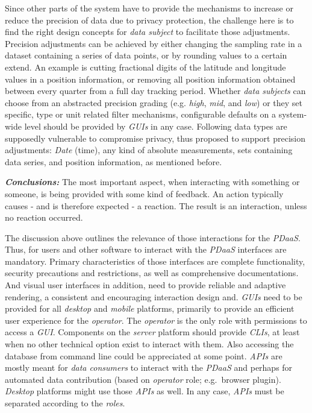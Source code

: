 \documentclass[12pt,english,a4paper,titlepage,cleardoublepage=empty,dottedtoc]{report}
\begin{document}
Since other parts of the system have to provide the mechanisms to
increase or reduce the precision of data due to privacy protection, the
challenge here is to find the right design concepts for \emph{data
subject} to facilitate those adjustments. Precision adjustments can be
achieved by either changing the sampling rate in a dataset containing a
series of data points, or by rounding values to a certain extend. An
example is cutting fractional digits of the latitude and longitude
values in a position information, or removing all position information
obtained between every quarter from a full day tracking period. Whether
\emph{data subjects} can choose from an abstracted precision grading
(e.g. \emph{high}, \emph{mid}, and \emph{low}) or they set specific,
type or unit related filter mechanisms, configurable defaults on a
system-wide level should be provided by \emph{GUIs} in any case.
Following data types are supposedly vulnerable to compromise privacy,
thus proposed to support precision adjustments: \emph{Date} (time), any
kind of absolute measurements, sets containing data series, and position
information, as mentioned before.

\emph{\textbf{Conclusions:}} The most important aspect, when interacting
with something or someone, is being provided with some kind of feedback.
An action typically causes - and is therefore expected - a reaction. The
result is an interaction, unless no reaction occurred.

The discussion above outlines the relevance of those interactions for
the \emph{PDaaS}. Thus, for users and other software to interact with
the \emph{PDaaS} interfaces are mandatory. Primary characteristics of
those interfaces are complete functionality, security precautions and
restrictions, as well as comprehensive documentations. And visual user
interfaces in addition, need to provide reliable and adaptive rendering,
a consistent and encouraging interaction design and. \emph{GUIs} need to
be provided for all \emph{desktop} and \emph{mobile} platforms,
primarily to provide an efficient user experience for the
\emph{operator}. The \emph{operator} is the only role with permissions
to access a \emph{GUI}. Components on the \emph{server} platform should
provide \emph{CLIs}, at least when no other technical option exist to
interact with them. Also accessing the database from command line could
be appreciated at some point. \emph{APIs} are mostly meant for
\emph{data consumers} to interact with the \emph{PDaaS} and perhaps for
automated data contribution (based on \emph{operator} role; e.g.~browser
plugin). \emph{Desktop} platforms might use those \emph{APIs} as well.
In any case, \emph{APIs} must be separated according to the
\emph{roles}.
\end{document}
